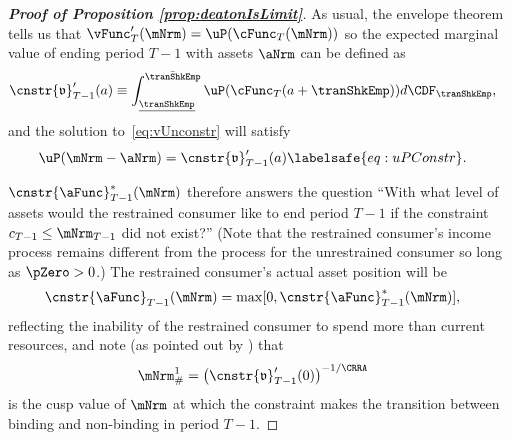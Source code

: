 \documentclass[\econtexRoot/BufferStockTheory]{subfiles}
\begin{document}
\begin{proof}[\textbf{Proof of Proposition \ref{prop:deatonIsLimit}}]
As usual, the envelope theorem tells us that $\vFunc_{T}^{\prime}(\mNrm)=\uP(\cFunc_{T}(\mNrm))$ so the expected marginal value of ending period $T-1$ with assets $\aNrm$ can be defined as
\begin{equation}\begin{gathered}\begin{aligned}
      \cnstr{\mathfrak{v}}_{T-1}^{\prime}(a)  & \equiv  \int_{\underline{\tranShkEmp}}^{\bar{\tranShkEmp}} \uP(\cFunc_{T}(a+\tranShkEmp)) d\CDF_{\tranShkEmp}, \notag
    \end{aligned}\end{gathered}\end{equation}
and the solution to~\eqref{eq:vUnconstr} will satisfy
\begin{equation}\begin{gathered}\begin{aligned}
      \uP(\mNrm-\aNrm)  & =  \cnstr{\mathfrak{v}}_{T-1}^{\prime}(a) \labelsafe{eq:uPConstr}.
    \end{aligned}\end{gathered}\end{equation}

$\cnstr{\aFunc}_{T-1}^{*}(\mNrm)$ therefore answers the question ``With what level of assets would the restrained consumer like to end period $T-1$ if the constraint $c_{T-1} \leq \mNrm_{T-1}$ did not exist?''  (Note that the restrained consumer's income process remains different from the process for the unrestrained consumer so long as $\pZero>0$.)  The restrained consumer's actual asset position will be
\begin{equation}\begin{gathered}\begin{aligned}
      \cnstr{\aFunc}_{T-1}(\mNrm)  & = \max[0,\cnstr{\aFunc}^{*}_{T-1}(\mNrm)], \notag
    \end{aligned}\end{gathered}\end{equation}
reflecting the inability of the restrained consumer to spend more than current resources, and note (as pointed out by \cite{deatonLiqConstr}) that
\begin{equation}\begin{gathered}\begin{aligned}
      \mNrm^{1}_{\#}  & = {\left( \cnstr{\mathfrak{v}}_{T-1}^{\prime}(0)\right)}^{-1/\CRRA} \notag
    \end{aligned}\end{gathered}\end{equation}
is the cusp value of $\mNrm$ at which the constraint makes the
transition between binding and non-binding in period $T-1$.


\end{proof}
\end{document}
